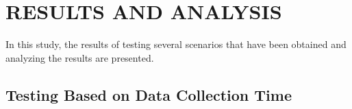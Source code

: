 





% 


\section{RESULTS AND ANALYSIS}
\label{sec:hasilpembahasan}

In this study, the results of testing several scenarios that have been obtained and analyzing the results are presented.

\subsection{Testing Based on Data Collection Time}

